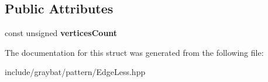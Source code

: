 \subsection*{Public Attributes}
\begin{DoxyCompactItemize}
\item 
\hypertarget{structgraybat_1_1pattern_1_1EdgeLess_a26ac5069cfdaf54b2492fb5036e0f0f4}{}const unsigned {\bfseries vertices\+Count}\label{structgraybat_1_1pattern_1_1EdgeLess_a26ac5069cfdaf54b2492fb5036e0f0f4}

\end{DoxyCompactItemize}


The documentation for this struct was generated from the following file\+:\begin{DoxyCompactItemize}
\item 
include/graybat/pattern/Edge\+Less.\+hpp\end{DoxyCompactItemize}
